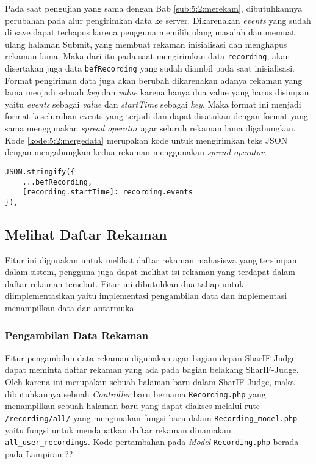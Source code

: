 Pada saat pengujian yang sama dengan Bab \ref{sub:5:2:merekam}, dibutuhkannya perubahan pada alur pengirimkan data ke server. Dikarenakan \textit{events} yang sudah di save dapat terhapus karena pengguna memilih ulang masalah dan memuat ulang halaman Submit, yang membuat rekaman inisialisasi dan menghapus rekaman lama. Maka dari itu pada saat mengirimkan data \verb|recording|, akan disertakan juga data \verb|befRecording| yang sudah diambil pada saat inisialisasi. Format pengiriman data juga akan berubah dikarenakan adanya rekaman yang lama menjadi sebuah \textit{key} dan \textit{value} karena hanya dua value yang harus disimpan yaitu \textit{events} sebagai \textit{value} dan \textit{startTime} sebagai \textit{key}. Maka format ini menjadi format keseluruhan events yang terjadi dan dapat disatukan dengan format yang sama menggunakan \textit{spread operator} agar seluruh rekaman lama digabungkan. Kode \ref{kode:5:2:mergedata} merupakan kode untuk mengirimkan teks JSON dengan mengabungkan kedua rekaman menggunakan \textit{spread operator}.

\begin{lstlisting}[caption={\textit{object callback function}}, label={kode:5:2:mergedata}]
JSON.stringify({
    ...befRecording,
    [recording.startTime]: recording.events
}),
\end{lstlisting}

\subsection{Melihat Daftar Rekaman}

Fitur ini digunakan untuk melihat daftar rekaman mahasiswa yang tersimpan dalam sistem, pengguna juga dapat melihat isi rekaman yang terdapat dalam daftar rekaman tersebut. Fitur ini dibutuhkan dua tahap untuk diimplementasikan yaitu implementasi pengambilan data dan implementasi menampilkan data dan antarmuka.

\subsubsection{Pengambilan Data Rekaman}

Fitur pengambilan data rekaman digunakan agar bagian depan SharIF-Judge dapat meminta daftar rekaman yang ada pada bagian belakang SharIF-Judge. Oleh karena ini merupakan sebuah halaman baru dalam SharIF-Judge, maka dibutuhkannya sebuah \textit{Controller} baru bernama \verb|Recording.php| yang menampilkan sebuah halaman baru yang dapat diakses melalui rute \verb|/recording/all/| yang mengunakan fungsi baru dalam \verb|Recording_model.php| yaitu fungsi untuk mendapatkan daftar rekaman dinamakan \verb|all_user_recordings|. Kode pertambahan pada \textit{Model} \verb|Recording.php| berada pada Lampiran ??.

